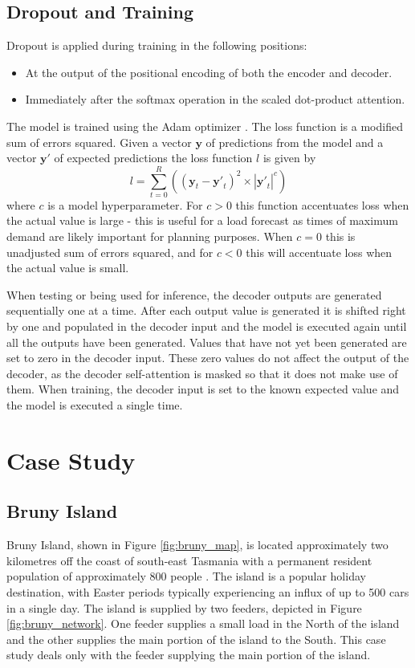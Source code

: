 \documentclass[conference]{IEEEtran}
\begin{document}
\subsection{Dropout and Training}
Dropout is applied during training in the following positions:
\begin{itemize}
	\item At the output of the positional encoding of both the encoder and decoder.
	\item Immediately after the softmax operation in the scaled dot-product attention.
\end{itemize}
The model is trained using the Adam optimizer \cite{Kingma2014}.
The loss function is a modified sum of errors squared.
Given a vector $\boldsymbol{y}$ of predictions from the model and a vector $\boldsymbol{y'}$ of expected predictions the loss function $l$ is given by 
\begin{equation}
l = \sum_{t=0}^{R}((\boldsymbol{y}_t - \boldsymbol{y'}_t)^2 \times |\boldsymbol{y'}_t|^c)
\end{equation}
where $c$ is a model hyperparameter.
For $c>0$ this function accentuates loss when the actual value is large - this is useful for a load forecast as times of maximum demand are likely important for planning purposes.
When $c=0$ this is unadjusted sum of errors squared, and for $c<0$ this will accentuate loss when the actual value is small.

When testing or being used for inference, the decoder outputs are generated sequentially one at a time.
After each output value is generated it is shifted right by one and populated in the decoder input and the model is executed again until all the outputs have been generated.
Values that have not yet been generated are set to zero in the decoder input.
These zero values do not affect the output of the decoder, as the decoder self-attention is masked so that it does not make use of them.
When training, the decoder input is set to the known expected value and the model is executed a single time.


\section{Case Study}

\subsection{Bruny Island}
Bruny Island, shown in Figure \ref{fig:bruny_map}, is located approximately two kilometres off the coast of south-east Tasmania with a permanent resident population of approximately 800 people \cite{census2016}.
The island is a popular holiday destination, with Easter periods typically experiencing an influx of up to 500 cars in a single day.
The island is supplied by two feeders, depicted in Figure \ref{fig:bruny_network}.
One feeder supplies a small load in the North of the island and the other supplies the main portion of the island to the South.
This case study deals only with the feeder supplying the main portion of the island.
\end{document}
